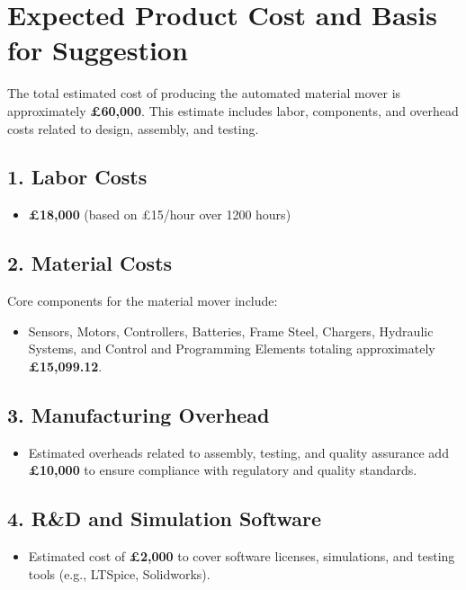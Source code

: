 \documentclass[12pt]{article}
\begin{document}
\section*{Expected Product Cost and Basis for Suggestion}

The total estimated cost of producing the automated material mover is approximately \textbf{£60,000}. This estimate includes labor, components, and overhead costs related to design, assembly, and testing.

\subsection*{1. Labor Costs}
\begin{itemize}
    \item \textbf{£18,000} (based on £15/hour over 1200 hours)
\end{itemize}

\subsection*{2. Material Costs}
Core components for the material mover include:
\begin{itemize}
    \item Sensors, Motors, Controllers, Batteries, Frame Steel, Chargers, Hydraulic Systems, and Control and Programming Elements totaling approximately \textbf{£15,099.12}.
\end{itemize}

\subsection*{3. Manufacturing Overhead}
\begin{itemize}
    \item Estimated overheads related to assembly, testing, and quality assurance add \textbf{£10,000} to ensure compliance with regulatory and quality standards.
\end{itemize}

\subsection*{4. R\&D and Simulation Software}
\begin{itemize}
    \item Estimated cost of \textbf{£2,000} to cover software licenses, simulations, and testing tools (e.g., LTSpice, Solidworks).
\end{itemize}
\end{document}
